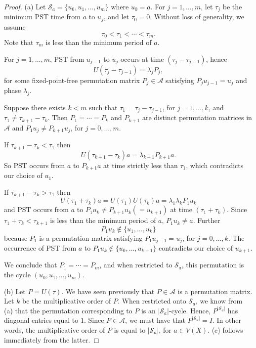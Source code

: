 \documentclass{amsart}
\theoremstyle{plain}
\theoremstyle{remark}\newtheorem{con}[theorem]{Construction}
\theoremstyle{remark} \newtheorem*{remark}{Remark}
\theoremstyle{remark} \newtheorem{example}{Example}
\newcommand{\cS}{\mathcal{S}}
\newcommand{\cA}{\mathcal{A}}
\begin{document}
\begin{proof}
(a) Let $\cS_a =\{u_0, u_1, \ldots, u_m\}$ where $u_0=a$.
For $j=1,\ldots, m$, let $\tau_j$ be the minimum PST time from $a$ to $u_j$, and let $\tau_0=0$.  Without loss of generality, we assume 
\begin{equation*}
    \tau_0<\tau_1 < \cdots < \tau_m.
\end{equation*}  
Note that $\tau_m$ is less than the minimum period of $a$. %

For $j=1,\ldots,m$, PST from $u_{j-1}$ to $u_j$ occurs at time $(\tau_j-\tau_{j-1})$, hence 
\begin{equation*}
    U\left(\tau_j-\tau_{j-1}\right) = \lambda_j P_j,
\end{equation*}
for some fixed-point-free permutation matrix $P_j \in \cA$ satisfying 
$P_ju_{j-1}=u_j$ and phase $\lambda_j$.

Suppose there exists $k<m$ such that $\tau_1=\tau_j-\tau_{j-1}$,
for $j=1,\ldots,k$, and $\tau_1\neq \tau_{k+1}-\tau_k$.
Then $P_1=\cdots=P_k$ and $P_{k+1}$ are distinct permutation matrices in $\cA$ and $P_1 u_j \neq P_{k+1}u_j$, for $j=0,\ldots,m$.

If $\tau_{k+1}-\tau_k<\tau_1$ then 
\begin{equation*}
    U(\tau_{k+1}-\tau_k) a = \lambda_{k+1}P_{k+1}a.
\end{equation*}
So PST occurs from $a$ to $P_{k+1}a$ at time strictly less than $\tau_1$, which contradicts our choice of $u_1$.

If $\tau_{k+1}-\tau_k > \tau_1$ then 
\begin{equation*}
U(\tau_1+\tau_k) a = U(\tau_1) U(\tau_k)a = \lambda_1\lambda_k P_1u_k
\end{equation*}
and PST occurs from $a$ to $P_1u_k\neq P_{k+1}u_k (= u_{k+1})$ at time $(\tau_1+\tau_k)$.
Since $\tau_1+\tau_k < \tau_{k+1}$ is less than the minimum period of $a$, $P_1u_k \neq a$.
Further 
\begin{equation*}
   P_1u_k \not\in \{u_1, \ldots,u_k\} 
\end{equation*} 
because $P_1$ is a permutation matrix satisfying $P_1u_{j-1}=u_j$,
for $j=0,\ldots,k$.  The occurrence of PST from $a$
to  $P_1u_k \not \in \{u_0,\ldots, u_{k+1}\}$ contradicts our choice of $u_{k+1}$.

We conclude that $P_1=\cdots = P_m$, and when restricted to $\cS_a$, this permutation is
the cycle $\left(u_0, u_1, \ldots, u_m\right)$.

(b) Let $P = U(\tau)$. We have seen previously that $P \in \cA$ is a permutation matrix. Let $k$ be the multiplicative order of $P$. When restricted onto $\cS_a$, we know from (a) that the permutation corresponding to $P$ is an $|\cS_a|$-cycle. Hence, $P^{|\cS_a|}$ has diagonal entries equal to $1$. Since $P \in \cA$, we must have that $P^{|\cS_a|} = I$. In other words, the multiplicative order of $P$ is equal to $|\cS_a|$, for $a\in V(X)$. (c) follows immediately from the latter.
\end{proof}
\end{document}
